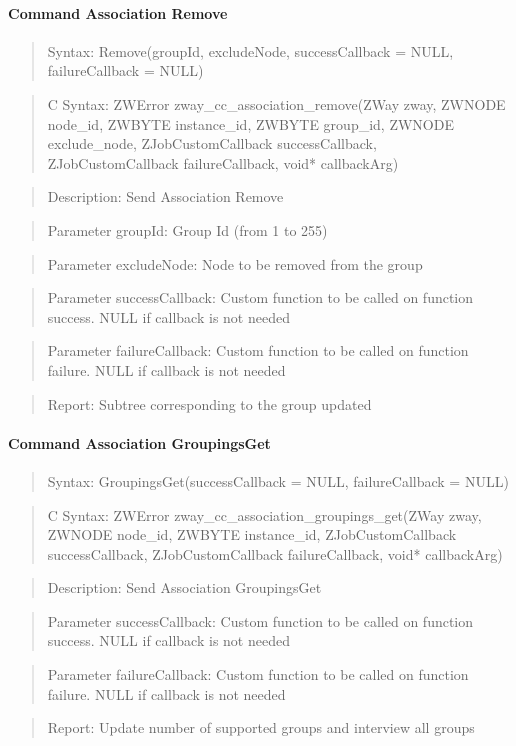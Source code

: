 \paragraph{Command Association Remove}
\begin{quote}Syntax: Remove(groupId, excludeNode, successCallback = NULL, failureCallback = NULL)\end{quote}
\begin{quote}C Syntax: ZWError zway\_cc\_association\_remove(ZWay zway, ZWNODE node\_id, ZWBYTE instance\_id, ZWBYTE group\_id, ZWNODE exclude\_node, ZJobCustomCallback successCallback, ZJobCustomCallback failureCallback, void* callbackArg)\end{quote}
\begin{quote}Description: Send Association Remove\end{quote}
\begin{quote}Parameter groupId: Group Id (from 1 to 255)\end{quote}
\begin{quote}Parameter excludeNode: Node to be removed from the group\end{quote}
\begin{quote}Parameter successCallback: Custom function to be called on function success. NULL if callback is not needed\end{quote}
\begin{quote}Parameter failureCallback: Custom function to be called on function failure. NULL if callback is not needed\end{quote}
\begin{quote}Report: Subtree corresponding to the group updated\end{quote}

\paragraph{Command Association GroupingsGet}
\begin{quote}Syntax: GroupingsGet(successCallback = NULL, failureCallback = NULL)\end{quote}
\begin{quote}C Syntax: ZWError zway\_cc\_association\_groupings\_get(ZWay zway, ZWNODE node\_id, ZWBYTE instance\_id, ZJobCustomCallback successCallback, ZJobCustomCallback failureCallback, void* callbackArg)\end{quote}
\begin{quote}Description: Send Association GroupingsGet\end{quote}
\begin{quote}Parameter successCallback: Custom function to be called on function success. NULL if callback is not needed\end{quote}
\begin{quote}Parameter failureCallback: Custom function to be called on function failure. NULL if callback is not needed\end{quote}
\begin{quote}Report: Update number of supported groups and interview all groups\end{quote}


